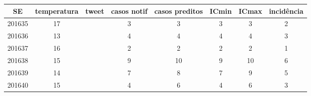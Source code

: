 \begin{tabular}{c|ccccccc}
  \hline
SE & temperatura & tweet & casos notif & casos preditos & ICmin & ICmax & incidência \\ 
  \hline
201635 & 17 &  & 3 & 3 & 3 & 3 & 2 \\ 
  201636 & 13 &  & 4 & 4 & 4 & 4 & 3 \\ 
  201637 & 16 &  & 2 & 2 & 2 & 2 & 1 \\ 
  201638 & 15 &  & 9 & 10 & 9 & 10 & 6 \\ 
  201639 & 14 &  & 7 & 8 & 7 & 9 & 5 \\ 
  201640 & 15 &  & 4 & 6 & 4 & 6 & 3 \\ 
   \hline
\end{tabular}
